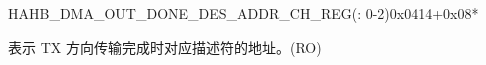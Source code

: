 {    \begin{register}{H}{AHB\_DMA\_OUT\_DONE\_DES\_ADDR\_CH\_REG(: 0-2)}{0x0414+0x08*}\label{regdesc:AHBDMAOUTDONEDESADDRCHNREG}
    \regnewline%
    \begin{regdesc}\begin{reglist}
    \label{fielddesc:AHBDMAOUTDONEDESADDRCHN}\item [AHB\_DMA\_OUT\_DONE\_DES\_ADDR\_CH\regindex{n}] 表示 TX 方向传输完成时对应描述符的地址。(RO)
    \end{reglist}\end{regdesc}
    \end{register}
}
